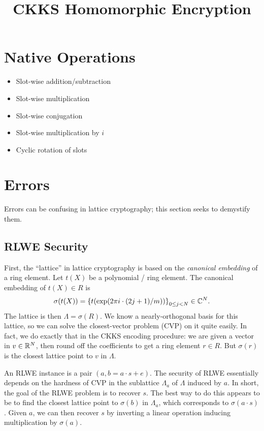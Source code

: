 \documentclass[../fheimpl.tex]{subfiles}
\begin{document}
\ifcompileasbook
\else
\title{CKKS Homomorphic Encryption}
\hypersetup{pageanchor=false}
\maketitle
\listoffixmes
\tableofcontents
\compileasbooktrue
\hypersetup{pageanchor=true}
\fi

\section{Native Operations}
    \begin{itemize}
        \item Slot-wise addition/subtraction
        \item Slot-wise multiplication
        \item Slot-wise conjugation
        \item Slot-wise multiplication by $i$
        \item Cyclic rotation of slots		
    \end{itemize}

\section{Errors}
Errors can be confusing in lattice cryptography; this section seeks to demystify them. 

\subsection{RLWE Security}
First, the ``lattice'' in lattice cryptography is based on the \emph{canonical embedding} of a ring element. Let $t(X)$ be a polynomial / ring element. The canonical embedding of $t(X)\in R$ is
\[\sigma(t(X)) = \set*{t\parens*{\exp\parens*{2\pi i\cdot (2j+1)/m}}}_{0\le j<N}\in \C^N.\]
The lattice is then $\Lambda=\sigma(R)$. We know a nearly-orthogonal basis for this lattice, so we can solve the closest-vector problem (CVP) on it quite easily. In fact, we do exactly that in the CKKS encoding procedure: we are given a vector in $v\in \mathbb{R}^N$, then round off the coefficients to get a ring element $r\in R$. But $\sigma(r)$ is the closest lattice point to $v$ in $\Lambda$.

An RLWE instance is a pair $(a, b=a\cdot s+e)$. The security of RLWE essentially depends on the hardness of CVP in the sublattice $\Lambda_a$ of $\Lambda$ induced by $a$. In short, the goal of the RLWE problem is to recover $s$. The best way to do this appears to be to find the closest lattice point to $\sigma(b)$ in $\Lambda_a$, which corresponds to $\sigma(a\cdot s)$. Given $a$, we can then recover $s$ by inverting a linear operation inducing multiplication by $\sigma(a)$.
\end{document}
